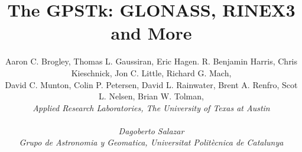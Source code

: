 \documentclass[letterpaper,ugly,10pt]{ion-gps}
\title{\huge\bf The GPSTk: GLONASS, RINEX3 and More }
\author{ Aaron C. Brogley, Thomas L. Gaussiran, Eric Hagen. R. Benjamin Harris, Chris Kieschnick, Jon C. Little,  Richard G. Mach, \\
David C. Munton, Colin P. Petersen, David L. Rainwater, Brent A. Renfro, Scot L. Nelsen, Brian W. Tolman, \\
       \it{Applied Research Laboratories, The University of Texas at Austin} \\
	\\
	Dagoberto Salazar \\
	\it{Grupo de Astronomia y Geomatica, Universitat Polit\`{e}cnica de Catalunya} }
\date{}
\begin{document}
\def\figurename{Fig.}
\def\tablename{Table}

\pagestyle{plain} %

\maketitle


















\nocite{ion:gnss04}
\nocite{rinex2format,rinex300format}
\nocite{isgps}




\end{document}
